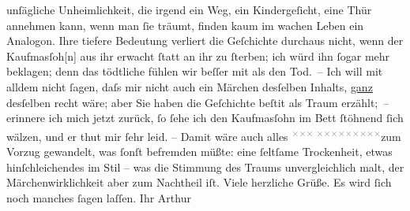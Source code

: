 \begin{ledgroupsized}[t]{13cm}
               unſägliche Unheimlichkeit, die irgend ein Weg, ein Kindergeſicht, eine Thür annehmen
               kann, wenn man ſie träumt, finden kaum im wachen Leben ein Analogon. Ihre tiefere
               Bedeutung verliert die Geſchichte durchaus nicht, wenn der Kaufma{\geminationn}sſoh{[}n{]} aus ihr erwacht ſtatt an ihr zu ſterben; ich
               würd ihn ſogar mehr beklagen; denn das tödtliche fühlen wir beſſer mit als den Tod. –
               Ich will mit alldem {\pb}nicht ſagen, daſs mir \introOben{}nicht\introOben{} auch ein Märchen desſelben Inhalts, \uline{ganz} desſelben recht wäre; aber Sie
               haben die Geſchichte beſti{\geminationm}t als Traum erzählt; – erinnere ich mich jetzt zurück,
               ſo ſehe ich den Kaufma{\geminationn}sſohn im Bett ſtöhnend ſich wälzen, und er thut mir ſehr leid.
               –\pend
           \pstart
           Damit wäre auch alles \substVorne{}\textsuperscript{\textcolor{gray}{×}\-\textcolor{gray}{×}\-\textcolor{gray}{×}{ }\textcolor{gray}{×}\-\textcolor{gray}{×}\-\textcolor{gray}{×}\-\textcolor{gray}{×}\-\textcolor{gray}{×}\-\textcolor{gray}{×}\-\textcolor{gray}{×}\-\textcolor{gray}{×}\-\textcolor{gray}{×}}\substDazwischen{}zum Vorzug gewandelt\substHinten{}, was ſonſt befremden müßte: eine ſeltſame Trockenheit, etwas
               hinſchleichendes im Stil – was die Stimmung des Traums unvergleichlich malt, der
               Märchenwirklichkeit aber zum Nachtheil iſt.\pend
           \pstart
           Viele herzliche Grüße. Es wird ſich noch manches ſagen laſſen.\pend
           \pstart Ihr \spacefill\mbox{Arthur}\pend{}
         
         \endnumbering{}\end{ledgroupsized}  \newcommand{\dateiname}{L00518}\newcommand{\titel}{Arthur Schnitzler an Hugo von Hofmannsthal, 26. 11. 1895}\newcommand{\editorInnen}{Martin Anton Müller und Gerd-Hermann Susen}
      